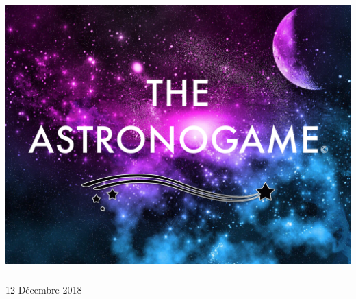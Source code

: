 \begin{titlepage}
\begin{center}
~\bigskip
\bigskip
\bigskip
\bigskip
\begin{center}
\includegraphics[width=17cm, height=10.5cm, scale=0.7]{AstronoGame.png}
\end{center}

\vfill
{\large 12 Décembre 2018}

\end{center}
\end{titlepage}
